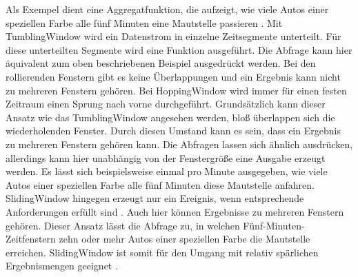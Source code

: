 Als Exempel dient eine Aggregatfunktion, die aufzeigt, wie viele Autos einer speziellen Farbe alle fünf Minuten eine Mautstelle passieren \cite{Prosise.}. Mit TumblingWindow wird ein Datenstrom in einzelne Zeitsegmente unterteilt. Für diese unterteilten Segmente wird eine Funktion ausgeführt. Die Abfrage kann hier äquivalent zum oben beschriebenen Beispiel ausgedrückt werden. Bei den rollierenden Fenstern gibt es keine Überlappungen und ein Ergebnis kann nicht zu mehreren Fenstern gehören. Bei HoppingWindow wird immer für einen festen Zeitraum einen Sprung nach vorne durchgeführt. Grundsätzlich kann dieser Ansatz wie das TumblingWindow angesehen werden, bloß überlappen sich die wiederholenden Fenster. Durch diesen Umstand kann es sein, dass ein Ergebnis zu mehreren Fenstern gehören kann. Die Abfragen lassen sich ähnlich ausdrücken, allerdings kann hier unabhängig von der Fenstergröße eine Ausgabe erzeugt werden. Es lässt sich beispielsweise einmal pro Minute ausgegeben, wie viele Autos einer speziellen Farbe alle fünf Minuten diese Mautstelle anfahren. SlidingWindow hingegen erzeugt nur ein Ereignis, wenn entsprechende Anforderungen erfüllt sind \cite{Azure.2017}. Auch hier können Ergebnisse zu mehreren Fenstern gehören. Dieser Ansatz lässt die Abfrage zu, in welchen Fünf-Minuten-Zeitfenstern zehn oder mehr Autos einer speziellen Farbe die Mautstelle erreichen. SlidingWindow ist somit für den Umgang mit relativ spärlichen Ergebnismengen geeignet \cite{Prosise.}.

 